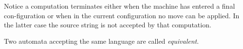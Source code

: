 Notice a computation terminates either when the machine has entered a final con-figuration or when in the current configuration no move can be applied. In the latter 
case the source string is not accepted by that computation. 
\begin{definition}
    Two automata accepting the same language are called \emph{equivalent}.
\end{definition}